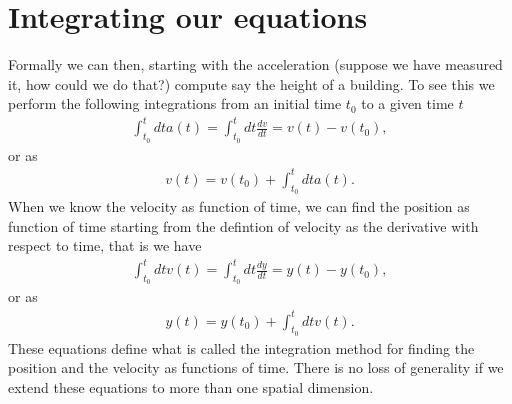 \documentclass[letterpaper,10pt,english]{sphinxmanual}
\begin{document}
\section{Integrating our equations}
\label{\detokenize{chapter1:integrating-our-equations}}
Formally we can then, starting with the acceleration (suppose we have measured it, how could we do that?)
compute say the height of a building.  To see this we perform the following integrations from an initial time \(t_0\)  to a given time \(t\)
\begin{equation*}
\begin{split}
\int_{t_0}^t dt a(t) = \int_{t_0}^t dt \frac{dv}{dt} = v(t)-v(t_0),
\end{split}
\end{equation*}
or as
\begin{equation*}
\begin{split}
v(t)=v(t_0)+\int_{t_0}^t dt a(t).
\end{split}
\end{equation*}
When we know the velocity as function of time, we can find the position as function of time starting from the defintion of velocity as the derivative with respect to time, that is we have
\begin{equation*}
\begin{split}
\int_{t_0}^t dt v(t) = \int_{t_0}^t dt \frac{dy}{dt} = y(t)-y(t_0),
\end{split}
\end{equation*}
or as
\begin{equation*}
\begin{split}
y(t)=y(t_0)+\int_{t_0}^t dt v(t).
\end{split}
\end{equation*}
These equations define what is called the integration method for
finding the position and the velocity as functions of time. There is
no loss of generality if we extend these equations to more than one
spatial dimension.
\end{document}
